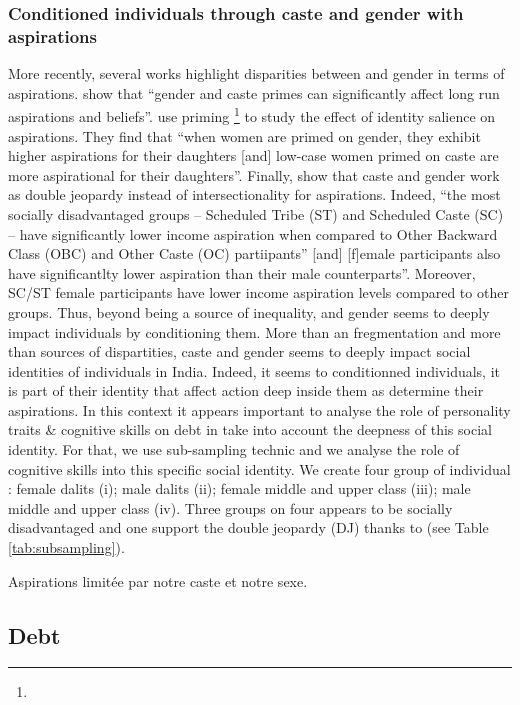\documentclass[a4paper, 11pt, onecolumn]{article}
\begin{document}
		\subsubsection{Conditioned individuals through caste and gender with aspirations}
More recently, several works highlight disparities between \jati and gender in terms of aspirations.
\cite{Mukherjee2017} show that ``gender and caste primes can significantly affect long run aspirations and beliefs''. 
\cite{Alvi2019} use priming \footnote{} to study the effect of identity salience on aspirations.
They find that ``when women are primed on gender, they exhibit higher aspirations for their daughters [and] low-case  women primed on caste are more aspirational for their daughters''.
Finally, \cite{Sarkar2020} show that caste and gender work as double jeopardy instead of intersectionality for aspirations.
Indeed, ``the most socially disadvantaged groups -- Scheduled Tribe (ST) and Scheduled Caste (SC) -- have significantly lower income aspiration when compared to Other Backward Class (OBC) and Other Caste (OC) partiipants'' [and] [f]emale participants also have significantlty lower aspiration than their male counterparts''.
Moreover, SC/ST female participants have lower income aspiration levels compared to other groups.
Thus, beyond being a source of inequality, \jati and gender seems to deeply impact individuals by conditioning them.
More than an fregmentation and more than sources of dispartities, caste and gender seems to deeply impact social identities of individuals in India.
Indeed, it seems to conditionned individuals, it is part of their identity that affect action deep inside them as determine their aspirations.
In this context it appears important to analyse the role of personality traits \& cognitive skills on debt in take into account the deepness of this social identity.
For that, we use sub-sampling technic and we analyse the role of cognitive skills into this specific social identity.
We create four group of individual : female dalits (i); male dalits (ii); female middle and upper class (iii); male middle and upper class (iv). 
Three groups on four appears to be socially disadvantaged and one support the double jeopardy (DJ) thanks to \cite{Sarkar2020} (see Table \ref{tab:subsampling}).


Aspirations limitée par notre caste et notre sexe.



	\subsection{Debt}
	
\end{document}
